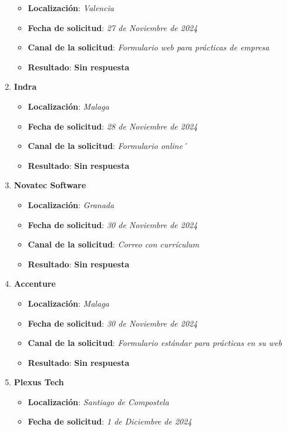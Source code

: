 \begin{enumerate}
	\begin{itemize}
		\item \textbf{Localización}: \textit{Valencia}
		\item \textbf{Fecha de solicitud}: \textit{27 de Noviembre de 2024}
		\item \textbf{Canal de la solicitud}: \textit{Formulario web para prácticas de empresa}
		\item \textbf{Resultado}: {\color{orange} \textbf{Sin respuesta}}
	\end{itemize}
	\item \textbf{Indra}
	\begin{itemize}
		\item \textbf{Localización}: \textit{Malaga}
		\item \textbf{Fecha de solicitud}: \textit{28 de Noviembre de 2024}
		\item \textbf{Canal de la solicitud}: \textit{Formulario online´}
		\item \textbf{Resultado}: {\color{orange} \textbf{Sin respuesta}}
	\end{itemize}
	\item \textbf{Novatec Software}
	\begin{itemize}
		\item \textbf{Localización}: \textit{Granada}
		\item \textbf{Fecha de solicitud}: \textit{30 de Noviembre de 2024}
		\item \textbf{Canal de la solicitud}: \textit{Correo con currículum}
		\item \textbf{Resultado}: {\color{orange} \textbf{Sin respuesta}}
	\end{itemize}
	\item \textbf{Accenture}
	\begin{itemize}
		\item \textbf{Localización}: \textit{Malaga}
		\item \textbf{Fecha de solicitud}: \textit{30 de Noviembre de 2024}
		\item \textbf{Canal de la solicitud}: \textit{Formulario estándar para prácticas en su web}
		\item \textbf{Resultado}: {\color{orange} \textbf{Sin respuesta}}
	\end{itemize}
		\item \textbf{Plexus Tech}
	\begin{itemize}
		\item \textbf{Localización}: \textit{Santiago de Compostela}
		\item \textbf{Fecha de solicitud}: \textit{1 de Diciembre de 2024}

\end{itemize}
\end{enumerate}
